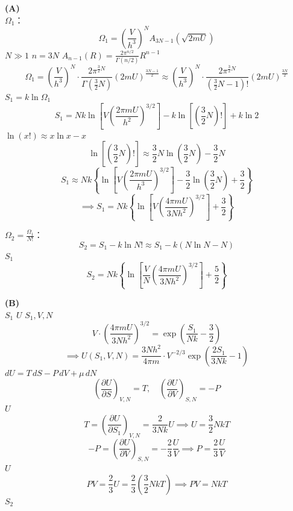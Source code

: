 \textbf{(A) } \\
 $\Omega_1$：
\[ \Omega_{1} = \left(\frac{V}{h^{3}}\right)^{N} A_{3N-1}(\sqrt{2mU}) \]
 $N \gg 1$ $n = 3N$ $A_{n-1}(R) = \frac{2\pi^{n/2}}{\Gamma(n/2)}R^{n-1}$
\[ \Omega_{1} = \left(\frac{V}{h^{3}}\right)^{N} \cdot \frac{2\pi^{\frac{3}{2}N}}{\Gamma\left(\frac{3}{2}N\right)} (2mU)^{\frac{3N-1}{2}} \approx \left(\frac{V}{h^{3}}\right)^{N} \cdot \frac{2\pi^{\frac{3}{2}N}}{\left(\frac{3}{2}N-1\right)!} (2mU)^{\frac{3N}{2}} \]
 $S_1 = k \ln \Omega_1$ 
\[ S_{1} = Nk \ln \left[ V \left(\frac{2\pi mU}{h^{2}}\right)^{3/2} \right] - k \ln\left[\left(\frac{3}{2}N\right)!\right] + k \ln 2 \]
 $\ln(x!) \approx x \ln x - x$ 
\[ \ln\left[\left(\frac{3}{2}N\right)!\right] \approx \frac{3}{2}N \ln \left(\frac{3}{2}N\right) - \frac{3}{2}N \]
\[ S_{1} \approx Nk \left\{ \ln \left[ V \left(\frac{2\pi mU}{h^{3}}\right)^{3/2} \right] - \frac{3}{2} \ln \left(\frac{3}{2}N\right) + \frac{3}{2} \right\} \]
\[ \implies S_{1} = Nk \left\{ \ln \left[ V \left(\frac{4\pi mU}{3Nh^{2}}\right)^{3/2} \right] + \frac{3}{2} \right\} \]

 $\Omega_2 = \frac{\Omega_1}{N!}$：
\[ S_{2} = S_{1} - k \ln N! \approx S_{1} - k (N \ln N - N) \]
 $S_1$ 
\[ S_{2} = Nk \left\{ \ln \left[ \frac{V}{N} \left(\frac{4\pi mU}{3Nh^{2}}\right)^{3/2} \right] + \frac{5}{2} \right\} \]

\vspace{1em}
\textbf{(B) } \\
 $S_1$  $U$  $S_1, V, N$ 
\[ V \cdot \left(\frac{4\pi mU}{3Nh^{2}}\right)^{3/2} = \exp\left(\frac{S_{1}}{Nk} - \frac{3}{2}\right) \]
\[ \implies U(S_1, V, N) = \frac{3Nh^{2}}{4\pi m} \cdot V^{-2/3} \exp\left(\frac{2S_{1}}{3Nk} - 1\right) \]
 $dU = T\,dS - P\,dV + \mu\,dN$ 
\[ \left(\frac{\partial U}{\partial S}\right)_{V,N} = T, \quad \left(\frac{\partial U}{\partial V}\right)_{S,N} = -P \]
 $U$ 
\[ T = \left(\frac{\partial U}{\partial S_1}\right)_{V,N} = \frac{2}{3Nk} U \implies U = \frac{3}{2}NkT \]
\[ -P = \left(\frac{\partial U}{\partial V}\right)_{S,N} = -\frac{2}{3} \frac{U}{V} \implies P = \frac{2}{3} \frac{U}{V} \]
 $U$
\[ PV = \frac{2}{3}U = \frac{2}{3}\left(\frac{3}{2}NkT\right) \implies PV = NkT \]
 $S_2$ 

